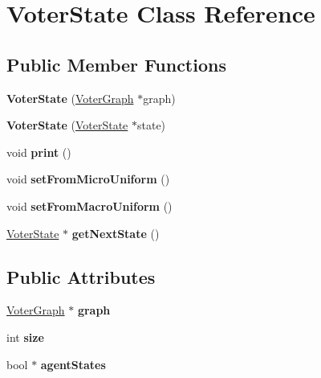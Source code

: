 \hypertarget{classVoterState}{\section{Voter\-State Class Reference}
\label{classVoterState}
}
\subsection*{Public Member Functions}
\begin{DoxyCompactItemize}
\item 
\hypertarget{classVoterState_a0c3a8bff59a2bafc229a3db931ca187c}{{\bfseries Voter\-State} (\hyperlink{classVoterGraph}{Voter\-Graph} $\ast$graph)}\label{classVoterState_a0c3a8bff59a2bafc229a3db931ca187c}

\item 
\hypertarget{classVoterState_ab0d594ad34986c52cdd05aa83e8237d8}{{\bfseries Voter\-State} (\hyperlink{classVoterState}{Voter\-State} $\ast$state)}\label{classVoterState_ab0d594ad34986c52cdd05aa83e8237d8}

\item 
\hypertarget{classVoterState_aa2f895e33bc38461b80d175b174f440d}{void {\bfseries print} ()}\label{classVoterState_aa2f895e33bc38461b80d175b174f440d}

\item 
\hypertarget{classVoterState_a061807952a7a83b53067ad3da4928f1e}{void {\bfseries set\-From\-Micro\-Uniform} ()}\label{classVoterState_a061807952a7a83b53067ad3da4928f1e}

\item 
\hypertarget{classVoterState_a8e7e962feebe6dc2f5cb7248207486da}{void {\bfseries set\-From\-Macro\-Uniform} ()}\label{classVoterState_a8e7e962feebe6dc2f5cb7248207486da}

\item 
\hypertarget{classVoterState_a075f01f6b7e5ae1cdcfae96727817612}{\hyperlink{classVoterState}{Voter\-State} $\ast$ {\bfseries get\-Next\-State} ()}\label{classVoterState_a075f01f6b7e5ae1cdcfae96727817612}

\end{DoxyCompactItemize}
\subsection*{Public Attributes}
\begin{DoxyCompactItemize}
\item 
\hypertarget{classVoterState_a0e9830920101914d609c898c1222d919}{\hyperlink{classVoterGraph}{Voter\-Graph} $\ast$ {\bfseries graph}}\label{classVoterState_a0e9830920101914d609c898c1222d919}

\item 
\hypertarget{classVoterState_a1bfb4f3c9811324131c1a459f76dfa9d}{int {\bfseries size}}\label{classVoterState_a1bfb4f3c9811324131c1a459f76dfa9d}

\item 
\hypertarget{classVoterState_a9cd00dc55326b56744e49e8357f2890e}{bool $\ast$ {\bfseries agent\-States}}\label{classVoterState_a9cd00dc55326b56744e49e8357f2890e}

\end{DoxyCompactItemize}


